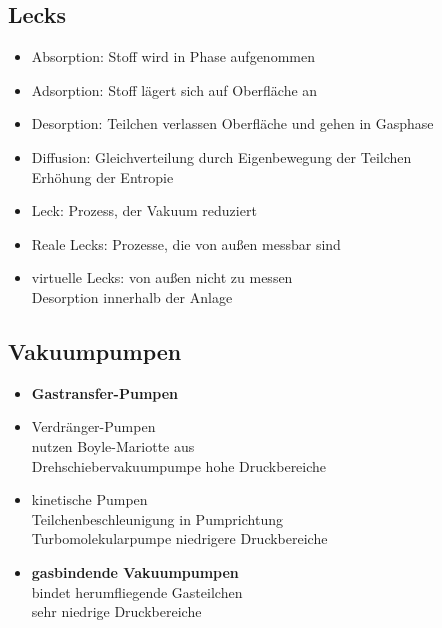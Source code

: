 \subsection{Lecks}
\begin{itemize}
    \item Absorption: Stoff wird in Phase aufgenommen
    \item Adsorption: Stoff lägert sich auf Oberfläche an 
    \item Desorption: Teilchen verlassen Oberfläche und gehen in Gasphase
    \item Diffusion: Gleichverteilung durch Eigenbewegung der Teilchen\\
    \to Erhöhung der Entropie
    \item Leck: Prozess, der Vakuum reduziert
    \item Reale Lecks: Prozesse, die von außen messbar sind 
    \item virtuelle Lecks: von außen nicht zu messen\\
    \to Desorption innerhalb der Anlage
\end{itemize}
\subsection{Vakuumpumpen}
\begin{itemize}
    \item \textbf{Gastransfer-Pumpen}
    \item Verdränger-Pumpen\\
    \to nutzen Boyle-Mariotte aus\\
    \to Drehschiebervakuumpumpe
    \to hohe Druckbereiche
    \item kinetische Pumpen\\
    \to Teilchenbeschleunigung in Pumprichtung\\
    \to Turbomolekularpumpe
    \to niedrigere Druckbereiche
    \\
    \item \textbf{gasbindende Vakuumpumpen}\\
    \to bindet herumfliegende Gasteilchen\\
    \to sehr niedrige Druckbereiche
\end{itemize}
